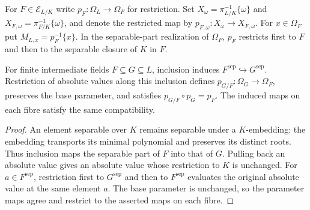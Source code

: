 \begin{definition}\label{def:algebraic-projections}
\leanok
{}
For $F\in\mathscr E_{L/K}$ write $p_F:\Omega_L\to\Omega_F$ for
restriction. Set $X_\omega=\pi_{L/K}^{-1}\{\omega\}$ and
$X_{F,\omega}=\pi_{F/K}^{-1}\{\omega\}$, and denote the restricted map
by $p_{F,\omega}:X_\omega\to X_{F,\omega}$. For $x\in\Omega_F$ put
$M_{L,x}=p_F^{-1}\{x\}$. In the separable-part realization of $\Omega_F$,
$p_F$ restricts first to $F$ and then to the separable closure of $K$ in $F$.
\end{definition}

\begin{lemma}\label{lem:finite-stage-transitions}
\leanok
{}
For finite intermediate fields $F\subseteq G\subseteq L$, inclusion
induces $F^{\mathrm{sep}}\hookrightarrow G^{\mathrm{sep}}$.
Restriction of absolute values along this inclusion defines
$p_{G/F}:\Omega_G\to\Omega_F$, preserves the base parameter,
and satisfies $p_{G/F}\circ p_G=p_F$. The induced maps on each
fibre satisfy the same compatibility.
\end{lemma}
\begin{proof}
An element separable over $K$ remains separable under a $K$-embedding:
the embedding transports its minimal polynomial and preserves its
distinct roots. Thus inclusion maps the separable part of $F$ into
that of $G$. Pulling back an absolute value gives an absolute value
whose restriction to $K$ is unchanged. For $a\in F^{\mathrm{sep}}$,
restriction first to $G^{\mathrm{sep}}$ and then to $F^{\mathrm{sep}}$
evaluates the original absolute value at the same element $a$.
The base parameter is unchanged, so the parameter maps agree and
restrict to the asserted maps on each fibre.
\end{proof}

